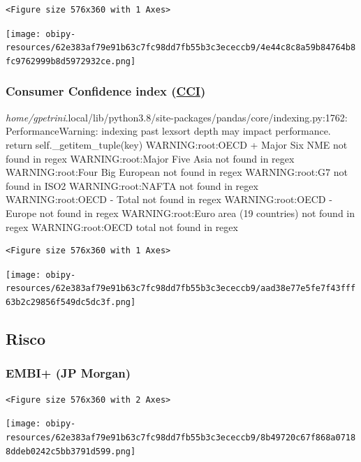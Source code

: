 \documentclass[11pt]{article}
\begin{document}
\begin{verbatim}
<Figure size 576x360 with 1 Axes>
\end{verbatim}


\begin{center}
\texttt{[image: obipy-resources/62e383af79e91b63c7fc98dd7fb55b3c3ececcb9/4e44c8c8a59b84764b8fc9762999b8d5972932ce.png]}
\end{center}


\subsubsection{Consumer Confidence index (\href{https://stats.oecd.org/Index.aspx?DataSetCode=MEI\_CCI}{CCI})}
\label{sec:org6a38dc9}

\emph{home/gpetrini}.local/lib/python3.8/site-packages/pandas/core/indexing.py:1762: PerformanceWarning: indexing past lexsort depth may impact performance.
  return self.\_getitem\_tuple(key)
WARNING:root:OECD + Major Six NME not found in regex
WARNING:root:Major Five Asia not found in regex
WARNING:root:Four Big European not found in regex
WARNING:root:G7 not found in ISO2
WARNING:root:NAFTA not found in regex
WARNING:root:OECD - Total not found in regex
WARNING:root:OECD - Europe not found in regex
WARNING:root:Euro area (19 countries) not found in regex
WARNING:root:OECD total  not found in regex

\begin{verbatim}
<Figure size 576x360 with 1 Axes>
\end{verbatim}


\begin{center}
\texttt{[image: obipy-resources/62e383af79e91b63c7fc98dd7fb55b3c3ececcb9/aad38e77e5fe7f43fff63b2c29856f549dc5dc3f.png]}
\end{center}

\subsection{Risco}
\label{sec:orgc3c953d}

\subsubsection{EMBI+ (JP Morgan)}
\label{sec:org900a287}

\begin{verbatim}
<Figure size 576x360 with 2 Axes>
\end{verbatim}


\begin{center}
\texttt{[image: obipy-resources/62e383af79e91b63c7fc98dd7fb55b3c3ececcb9/8b49720c67f868a07188ddeb0242c5bb3791d599.png]}
\end{center}
\end{document}

